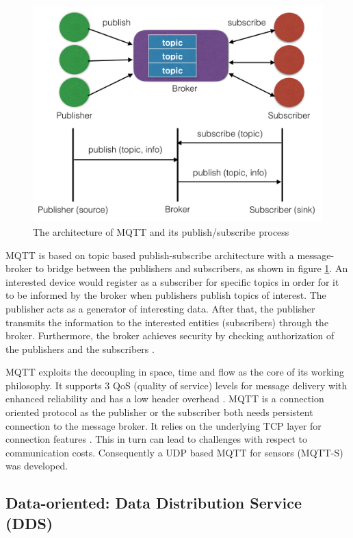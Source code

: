 \begin{figure}[!htbp]
\centering
\includegraphics[scale = 0.55]{mqtt.png}
\caption{The architecture of MQTT and its publish/subscribe process}
\label{fig:mqtt}
\end{figure}

MQTT is based on topic based publish-subscribe architecture with a message-broker to bridge between the publishers and subscribers, as shown in figure \ref{fig:mqtt}. An interested device would register as a subscriber for specific topics in order for it to be informed by the broker when publishers publish topics of interest. The publisher acts as a generator of interesting data. After that, the publisher transmits the information to the interested entities (subscribers) through the broker. Furthermore, the broker achieves security by checking authorization of the publishers and the subscribers \cite{4554519}\cite{6504105}.

MQTT exploits the decoupling in space, time and flow as the core of its working philosophy. It supports 3 QoS (quality of service) levels for message delivery with enhanced reliability and has a low header overhead \cite{mqtt_protocol}. MQTT is a connection oriented protocol as the publisher or the subscriber both needs persistent connection to the message broker. It relies on the underlying TCP layer for connection features \cite{6504105}. This in turn can lead to challenges with respect to communication costs. Consequently a UDP based MQTT for sensors (MQTT-S) \cite{4554519} was developed.

\subsection{Data-oriented: Data Distribution Service (DDS)}

